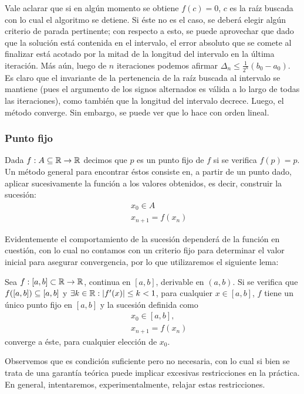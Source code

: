 Vale aclarar que si en algún momento se obtiene $f(c) = 0$, $c$ es la raíz buscada con lo cual el algoritmo se detiene. Si éste no es el caso, se deberá elegir algún criterio de parada pertinente; con respecto a esto, se puede aprovechar que dado que la solución está contenida en el intervalo, el error absoluto que se comete al finalizar está acotado por la mitad de la longitud del intervalo en la última iteración. Más aún, luego de $n$ iteraciones podemos afirmar $\Delta_n \leq \frac{1}{2^n} (b_0-a_0)$. Es claro que el invariante de la pertenencia de la raíz buscada al intervalo se mantiene (pues el argumento de los signos alternados es válida a lo largo de todas las iteraciones), como también que la longitud del intervalo decrece. Luego, el método converge. Sin embargo, se puede ver que lo hace con orden lineal.

\subsubsection{Punto fijo}
Dada $f: A\subseteq\mathbb{R} \rightarrow \mathbb{R}$ decimos que $p$ es un punto fijo de $f$ si se verifica $f(p) = p$.  Un método general para encontrar éstos consiste en, a partir de un punto dado, aplicar sucesivamente la función a los valores obtenidos, es decir, construir la sucesión:
	\begin{eqnarray}
		&& x_0 \in A\nonumber \\
		&& x_{n+1} = f(x_n) \nonumber
	\end{eqnarray}

Evidentemente el comportamiento de la sucesión dependerá de la función en cuestión, con lo cual no contamos con un criterio fijo para determinar el valor inicial para asegurar convergencia, por lo que utilizaremos el siguiente lema:
\begin{lema}
Sea $f: [a,b] \subset \mathbb{R} \rightarrow \mathbb{R}$, continua en $[a,b]$, derivable en $(a,b)$. Si se verifica que $f([a,b]) \subseteq [a,b]$ y $\exists k \in\mathbb{R} : |f'(x)| \leq k < 1$, para cualquier $x\in [a,b]$, $f$ tiene un único punto fijo en $[a,b]$ y la sucesión definida como 
	\begin{eqnarray}
		&& x_0 \in [a,b], \nonumber \\
		&& x_{n+1} = f(x_n) \nonumber
	\end{eqnarray}
	converge a éste, para cualquier elección de $x_0$.
\label{lema_f}
\end{lema}
Observemos que es condición suficiente pero no necesaria, con lo cual si bien se trata de una garantía teórica puede implicar excesivas restricciones en la práctica. En general, intentaremos, experimentalmente, relajar estas restricciones.

